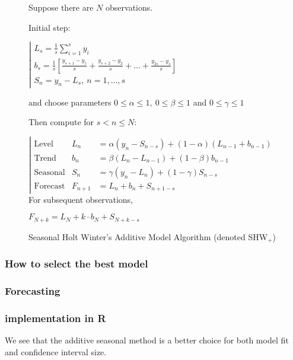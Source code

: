\begin{figure}[H]
\begin{tcolorbox}[width=.6\textwidth]%

Suppose there are $N$ observations.

Initial step:

$\left|\begin{array}{l}
L_s = \frac1s \sum_{i=1}^s y_i \\
b_s = \frac1s \left[\frac{y_{s+1}-y_1}{s}+\frac{y_{s+2}-y_2}{s}+\dots+\frac{y_{2s}-y_s}{s}\right]\\
S_n  = y_n-L_s, \ n=1,\dots,s
\end{array}\right.$

and choose parameters $0\leq\alpha\leq1,\ 0\leq\beta\leq1$ and $0\leq\gamma\leq1$

Then compute for $s<n\leq N$:

$\left|\begin{array}{lll}
\text{Level} &       L_n & = \alpha (y_n-S_{n-s})+(1-\alpha)(L_{n-1}+b_{n-1})\\
\text{Trend} &      b_n & = \beta(L_n-L_{n-1})+(1-\beta)b_{n-1}\\
\text{Seasonal} & S_n & = \gamma (y_n-L_n) + (1-\gamma)S_{n-s}\\
\text{Forecast} & F_{n+1} & = L_n+b_n+S_{n+1-s}
\end{array}\right.$
For subsequent observations,

$F_{N+k}=L_N+k\cdot b_N+S_{N+k-s}$
\label{SHWx}
\end{tcolorbox}
\caption{Seasonal Holt Winter’s Additive Model Algorithm (denoted SHW$_{+}$)}
\end{figure}


\subsubsection{How to select the best model}

\subsubsection{Forecasting}

\subsubsection{implementation in R}


We see that the additive seasonal method is a better choice for both model fit and confidence interval size.

